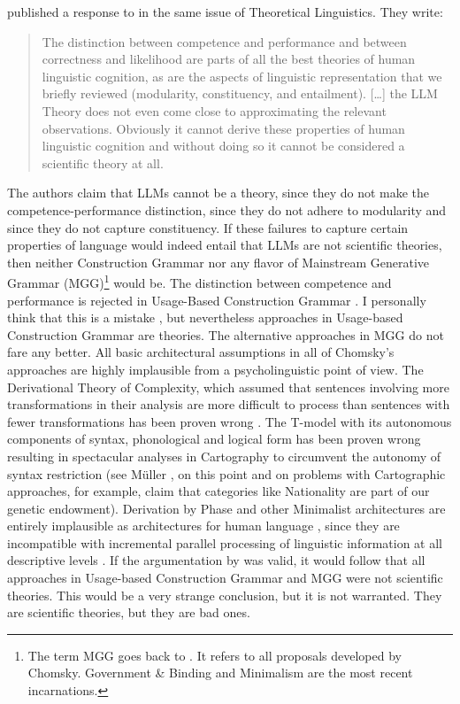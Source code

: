 \citet{FoxKatzir2024a} published a response to  in the same issue of
Theoretical Linguistics. They write:
\begin{quote}
The distinction between competence and performance and between correctness and likelihood are parts
of all the best theories of human linguistic cognition, as are the aspects of linguistic
representation that we briefly reviewed (modularity, constituency, and entailment). [\ldots]
the LLM Theory does not even come close to approximating the relevant observations. Obviously it
cannot derive these properties of human linguistic cognition and without doing so it cannot be
considered a scientific theory at all. \citep[]{FoxKatzir2024a}
\end{quote}
The authors claim that LLMs cannot be a theory, since they do not make the competence-performance
distinction, since they do not adhere to modularity and since they do not capture constituency. If
these failures to capture certain properties of language would indeed entail that LLMs are not
scientific theories, then neither Construction Grammar nor any flavor of Mainstream Generative
Grammar (MGG)\footnote{%
  The term MGG goes back to \citet[]{CJ2005a}. It refers to all proposals developed by
  Chomsky. Government \& Binding \citep{Chomsky81a} and Minimalism \citep{Chomsky95a-u} are the most recent incarnations.
} would be. The distinction between competence and performance is rejected in
Usage-Based Construction Grammar \citep[]{Diessel2015a-u}. I personally think that this is
a mistake \citep[Chapter~15]{MuellerGT-Eng5}, but nevertheless approaches in Usage-based Construction
Grammar are theories. The alternative approaches in MGG do not fare any better. All basic
architectural assumptions in all of Chomsky's approaches are highly implausible from a
psycholinguistic point of view. The Derivational Theory of Complexity, which assumed that sentences
involving more transformations in their analysis are more difficult to process than sentences with
fewer transformations has been proven wrong \parencites[--328]{FBG74a-u}[Chapter~15.1]{MuellerGT-Eng5}. The T-model with its autonomous components of 
syntax, phonological and logical form has been
proven wrong resulting in spectacular analyses in Cartography \citep{CR2010a} to circumvent the
autonomy of syntax restriction (see Müller \citeyear[Section~4.6.1.1]{MuellerGT-Eng5}, \citeyear[Section~4.10.2]{MuellerGermanic} on this point and on
problems with Cartographic approaches, for example,  claim that
categories like Nationality are part of our genetic endowment). Derivation by Phase \citep{Chomsky2008a} and other Minimalist architectures \citep[812, 830]{Richards2015a} are
entirely implausible as architectures for human language \citep[Section~3.6]{BM2021a}, since they
are incompatible with incremental parallel processing of linguistic information at all descriptive
levels \citep{Marslen-Wilson75a,TSKES96a,Labelle2007a}. If the argumentation by
 was valid, it would follow that all approaches in 
Usage-based Construction Grammar and MGG were not scientific theories. This would be a very strange
conclusion, but it is not warranted. They are scientific theories, but they are bad ones.

